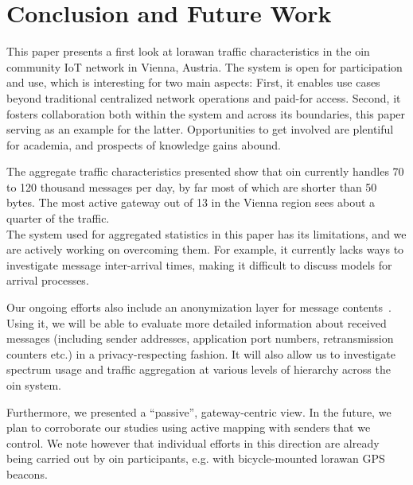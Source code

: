 \section{Conclusion and Future Work}\label{sec:conclusion}

This paper presents a first look at \gls{lorawan} traffic
characteristics in the \gls{oin} community \gls{IoT} network
in Vienna, Austria.
The system is open for participation and use, which is interesting
for two main aspects: First, it enables use cases beyond traditional
centralized network operations and paid-for access.
Second, it fosters collaboration both within the system and across
its boundaries, this paper serving as an example for the latter.
Opportunities to get involved are plentiful for academia, and
prospects of knowledge gains abound.

The aggregate traffic characteristics presented show that \gls{oin}
currently handles 70 to 120 thousand messages per day, by far most
of which are shorter than 50 bytes. The most active gateway out of
13 in the Vienna region sees about a quarter of the traffic.
\\

The system used for aggregated statistics in this paper has its
limitations, and we are actively working on overcoming them.
For example, it currently lacks ways to investigate message
inter-arrival times, making it difficult to discuss models for
arrival processes.

Our ongoing efforts also include an anonymization
layer for message contents~\cite{lora-gateway-anonymize}.
Using it, we will be able to evaluate more detailed information
about received messages (including sender addresses, application
port numbers, retransmission counters etc.) in a privacy-respecting
fashion. It will also allow us to investigate spectrum usage
and traffic aggregation at various levels of hierarchy across
the \gls{oin} system.

Furthermore, we presented a ``passive'', gateway-centric view.
In the future, we plan to corroborate our studies using active
mapping with senders that we control. We note however that individual
efforts in this direction are already being carried out by \gls{oin}
participants, e.g. with bicycle-mounted \gls{lorawan} \acrshort{GPS}
beacons.
